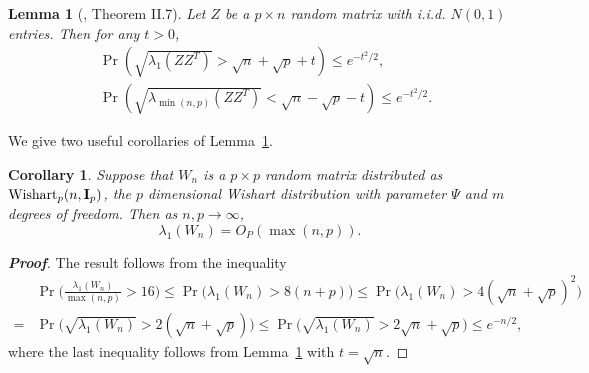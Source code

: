 \documentclass[review]{elsarticle}
\theoremstyle{plain}
\newtheorem{corollary}{\quad\quad Corollary}
\newtheorem{lemma}{\quad\quad Lemma}
\theoremstyle{definition}
\theoremstyle{remark}
\begin{document}
{\color{red}
    \begin{lemma}[\cite{DAVIDSON2001317}, Theorem II.7]\label{DSbound}
        Let $Z$ be a $p\times n$ random matrix with i.i.d. $N(0,1)$ entries.
        Then for any $t>0$,
        \begin{align*}
            &\Pr(\sqrt{\lambda_1(Z Z^T )}>\sqrt{n}+\sqrt{p}+t)\leq e^{-t^2/2},
            \\
            &\Pr(\sqrt{\lambda_{\min(n,p)}(Z Z^T )}<\sqrt{n}-\sqrt{p}-t)\leq e^{-t^2/2}.
        \end{align*}
    \end{lemma}
    We give two useful corollaries of Lemma~\ref{DSbound}.
}
\begin{corollary}\label{maxEigen}
    Suppose that $W_n$ is a $p \times p$ random matrix distributed as $\mathrm{Wishart}_p(n,\mathbf{I}_{p})$, the $p$ dimensional Wishart distribution with parameter $\Psi$ and $m$ degrees of freedom. Then as $n,p\to \infty$,
    $$
        \lambda_1(W_n)=O_P(\max(n,p)).
    $$
\end{corollary}
{\color{red}
\begin{proof}[\textbf{Proof}]
    The result follows from the inequality
    $$
    \begin{aligned}
        &\Pr\Big(\frac{\lambda_1(W_n)}{\max(n,p)}>16\Big)
        \leq
        \Pr\Big(\lambda_1(W_n)>8(n+p)\Big)
        \leq
        \Pr\Big(\lambda_1(W_n)>4(\sqrt{n}+\sqrt{p})^2\Big)\\
        =
        &\Pr\Big(\sqrt{\lambda_1(W_n)}>2(\sqrt{n}+\sqrt{p})\Big)
        \leq
        \Pr\Big(\sqrt{\lambda_1(W_n)}>2\sqrt{n}+\sqrt{p}\Big)\leq e^{-n/2},
    \end{aligned}
    $$
    where the last inequality follows from Lemma~\ref{DSbound} with $t=\sqrt{n}$.
\end{proof}
}
\end{document}
